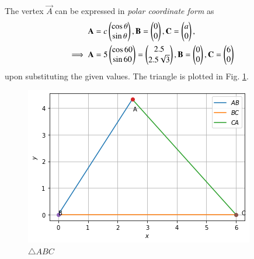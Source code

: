  The vertex  $\vec{A}$ can  be expressed  in {\em polar coordinate form} as
\begin{align}
\mathbf{A} &= c\begin{pmatrix}\cos \theta\\  \sin \theta\end{pmatrix} ,\mathbf{B} = \begin{pmatrix}0\\0\end{pmatrix},\mathbf{C} = \begin{pmatrix}a\\0\end{pmatrix},
\\
\implies \mathbf{A} &= 5\begin{pmatrix}\cos60 \\ \sin60\end{pmatrix} = \begin{pmatrix}2.5 \\ 2.5\sqrt{3}\end{pmatrix} ,\mathbf{B} = \begin{pmatrix}0\\0\end{pmatrix},\mathbf{C} = \begin{pmatrix}6\\0\end{pmatrix}
\end{align}
upon substituting the given values.  The triangle is plotted in Fig.     \ref{constr/tri/4/fig:triangle LMN}.

\begin{figure}[ht]
    \centering
    \includegraphics[width=\columnwidth]{solutions/triangle/4/assignment1 (2)/Figure1.png}
    \caption{$\triangle ABC$}
    \label{constr/tri/4/fig:triangle LMN}
\end{figure}

 
 
 

